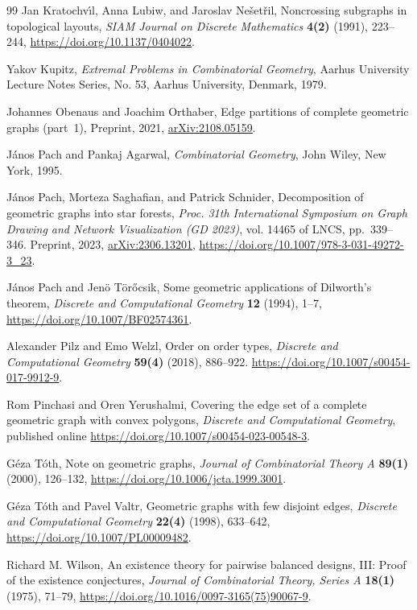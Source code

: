 \documentclass[a4paper,USenglish]{lipics-v2021}
\begin{document}
\begin{thebibliography}{99}
  Jan Kratochv{\'\i}l,  Anna Lubiw, and Jaroslav Ne{\v{s}}et{\v{r}}il,
Noncrossing subgraphs in topological layouts,
\emph{SIAM Journal on Discrete Mathematics}
\textbf{4(2)} (1991), 223--244,
\url{https://doi.org/10.1137/0404022}.

  Yakov Kupitz,
  \emph{Extremal Problems in Combinatorial Geometry},
  Aarhus University Lecture Notes Series,
  No. 53, Aarhus University, Denmark, 1979.

Johannes Obenaus and Joachim Orthaber,
Edge partitions of complete geometric graphs (part~1),
Preprint, 2021, \url{arXiv:2108.05159}.

J{\'a}nos Pach and Pankaj Agarwal,
\emph{Combinatorial Geometry},
John Wiley, New York, 1995. 

J{\'a}nos Pach, Morteza Saghafian, and Patrick Schnider,
Decomposition of geometric graphs into star forests,
\emph{Proc. 31th International Symposium on Graph Drawing and Network Visualization (GD 2023)},
vol. 14465 of LNCS, pp.~339--346.
Preprint, 2023, \url{arXiv:2306.13201},
\url{https://doi.org/10.1007/978-3-031-49272-3_23}.

J{\'{a}}nos Pach and Jen{\"{o}} T{\"{o}}r{\H{o}}csik,
Some geometric applications of Dilworth's theorem,
\emph{Discrete and Computational Geometry}
\textbf{12} (1994), 1--7,
\url{https://doi.org/10.1007/BF02574361}.

Alexander Pilz and Emo Welzl,
Order on order types,
\emph{Discrete and Computational Geometry}
\textbf{59(4)} (2018), 886--922.
\url{https://doi.org/10.1007/s00454-017-9912-9}.


Rom Pinchasi and Oren Yerushalmi,
Covering the edge set of a complete geometric graph with convex polygons,
\emph{Discrete and Computational Geometry},
published online \url{https://doi.org/10.1007/s00454-023-00548-3}.

G{\'{e}}za T{\'{o}}th,
Note on geometric graphs,
\emph{Journal of Combinatorial Theory {A}}
\textbf{89(1)} (2000), 126--132,
\url{https://doi.org/10.1006/jcta.1999.3001}.

G{\'{e}}za T{\'{o}}th and Pavel Valtr,
Geometric graphs with few disjoint edges,
\emph{Discrete and Computational Geometry}
\textbf{22(4)} (1998), 633--642,
\url{https://doi.org/10.1007/PL00009482}.

Richard M. Wilson,
An existence theory for pairwise balanced designs, III: Proof of the existence conjectures,
\emph{Journal of Combinatorial Theory, Series A}
\textbf{18(1)} (1975), 71--79,
\url{https://doi.org/10.1016/0097-3165(75)90067-9}.

\end{thebibliography}
\end{document}
